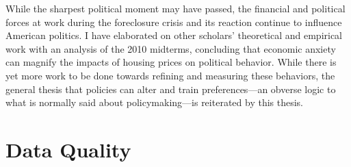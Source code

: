 \documentclass[12pt,oneside]{psthesis}
\begin{document}
While the sharpest political moment may have passed, the financial and political forces at work during the foreclosure crisis and its reaction continue to influence American politics.
I have elaborated on other scholars' theoretical and empirical work with an analysis of the 2010 midterms, concluding that economic anxiety can magnify the impacts of housing prices on political behavior.
While there is yet more work to be done towards refining and measuring these behaviors, the general thesis that policies can alter and train preferences---an obverse logic to what is normally said about policymaking---is reiterated by this thesis.

\appendix

\hypertarget{data-quality}{%
\chapter{Data Quality}\label{data-quality}}
\end{document}
